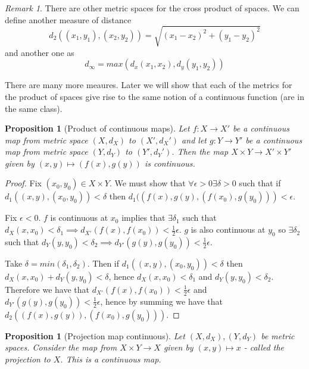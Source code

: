 \documentclass{article}
\theoremstyle{definition}
\theoremstyle{plain}%
\newtheorem{prop}[thm]{Proposition}
\theoremstyle{remark}
\newtheorem*{rem}{Remark}
\begin{document}
\begin{rem}
There are other metric spaces for the cross product of spaces. We can define another measure of distance \[d_2((x_1, y_1), (x_2, y_2)) = \sqrt{(x_1-x_2)^2 + (y_1-y_2)^2}\] and another one as \[d_{\infty} = max(d_x(x_1,x_2), d_y(y_1,y_2))\]
\end{rem}

\begin{flushleft}
There are many more meaures. Later we will show that each of the metrics for the product of spaces give rise to the same notion of a continuous function (are in the same class).
\end{flushleft}

\begin{prop}[Product of continuous maps]
Let $f: X \to X'$ be a continuous map from metric space $(X, d_X)$ to $(X', d_X')$ and let $g : Y \to Y'$ be a continuous map from metric space $(Y, d_Y)$ to $(Y', d_Y')$. Then the map $X \times Y \to X' \times Y'$ given by $(x,y) \mapsto (f(x), g(y))$ is continuous.
\end{prop}

\begin{proof}
Fix $(x_0, y_0) \in X \times Y$.
We must show that $\forall \epsilon > 0 \exists \delta > 0$ such that if $d_1((x,y), (x_0, y_0)) < \delta$ then $d_1((f(x), g(y), (f(x_0), g(y_0))) < \epsilon$.

Fix $\epsilon < 0$.
$f$ is continuous at $x_0$ implies that $\exists \delta_1$ such that $d_X(x, x_0) < \delta_1 \implies d_{X'}(f(x), f(x_0)) < \frac{1}{2}\epsilon$. $g$ is also continuous at $y_0$ so  $\exists \delta_2$ such that $d_Y(y, y_0) < \delta_2 \implies d_{Y'}(g(y), g(y_0)) < \frac{1}{2}\epsilon$.

Take $\delta = min(\delta_1, \delta_2)$. Then if $d_1((x,y), (x_0, y_0)) < \delta$ then $d_X(x, x_0) + d_Y(y, y_0) < \delta$, hence $d_X(x, x_0) < \delta_1$ and $d_Y(y, y_0) < \delta_2$. Therefore we have that $d_{X'}(f(x), f(x_0)) < \frac{1}{2}\epsilon$ and $d_{Y'}(g(y), g(y_0)) < \frac{1}{2}\epsilon$, hence by summing we have that $d_2((f(x), g(y)), (f(x_0), g(y_0)))$.
\end{proof}

\begin{prop}[Projection map continuous]
Let $(X, d_X), (Y, d_Y)$ be metric spaces. Consider the map from $X \times Y \to X$ given by $(x,y) \mapsto x$ - called the projection to $X$. This is a continuous map.
\end{prop}
\end{document}

